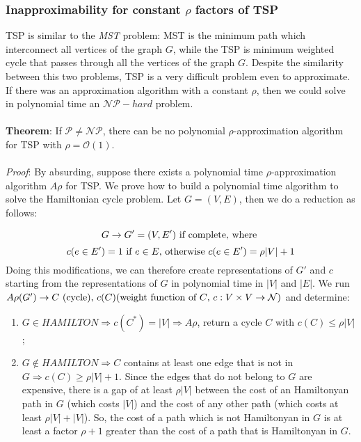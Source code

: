 \subsubsection{Inapproximability for constant $\rho$ factors of TSP}

TSP is similar to the \textit{MST} problem: MST is the minimum path which interconnect all vertices of the graph $G$, while the TSP is minimum weighted cycle that passes through all the vertices of the graph $G$. Despite the similarity between this two problems, TSP is a very difficult problem even to approximate. If there was an approximation algorithm with a constant $\rho$, then we could solve in polynomial time an $\mathcal{NP}-hard$ problem.\\
\\
\noindent
\textbf{Theorem}: If $\mathcal{P} \ne \mathcal{NP}$, there can be no polynomial $\rho$-approximation algorithm for TSP with $\rho = \mathcal{O}(1)$.\\
\\
\noindent
\textit{Proof}: By absurding, suppose there exists a polynomial time $\rho$-approximation algorithm $A\rho$ for TSP. We prove how to build a polynomial time algorithm to solve the Hamiltonian cycle problem. Let $G = (V, E)$, then we do a reduction as follows:

\[
    G \rightarrow G' = (V, E') \textnormal{ if complete, where }
\]
\[
    c(e \in E') = 1 \textnormal{ if } e \in E \textnormal{, otherwise } c(e \in E') = \rho|V| + 1
\]
Doing this modifications, we can therefore create representations of $G'$ and $c$ starting from the representations of $G$ in polynomial time in $|V|$ and $|E|$.
We run $A\rho(G') \rightarrow C \textnormal{ (cycle), } c(C) \textnormal{(weight function of $C$, $c: V \times V \rightarrow \mathcal{N}$)}$ and determine:
\begin{enumerate}
    \item $G \in HAMILTON \Rightarrow c(C^*) = |V| \Rightarrow A\rho$, return a cycle $C$ with $c(C) \le \rho|V|$;
    \item $G \not\in HAMILTON \Rightarrow C$ contains at least one edge that is not in $G \Rightarrow c(C) \ge \rho|V| + 1$. Since the edges that do not belong to $G$ are expensive, there is a gap of at least $\rho |V|$ between the cost of an Hamiltonyan path in $G$ (which costs $|V|$) and the cost of any other path (which costs at least $\rho |V| + |V|$). So, the cost of a path which is not Hamiltonyan in $G$ is at least a factor $\rho + 1$ greater than the cost of a path that is Hamiltonyan in $G$.
\end{enumerate}


